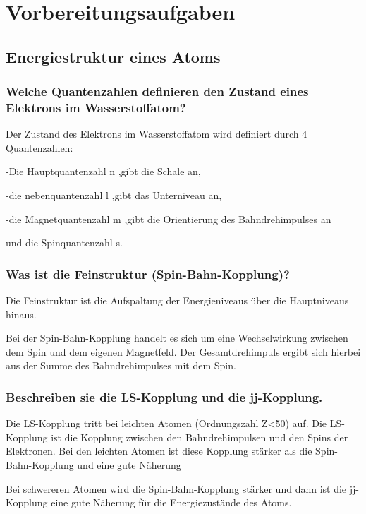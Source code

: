 \section{Vorbereitungsaufgaben}

\subsection{Energiestruktur eines Atoms}

\subsubsection{Welche Quantenzahlen definieren den Zustand eines Elektrons im Wasserstoffatom?}

Der Zustand des Elektrons im Wasserstoffatom wird definiert durch 4 Quantenzahlen:

-Die Hauptquantenzahl n ,gibt die Schale an,

-die nebenquantenzahl l ,gibt das Unterniveau an,

-die Magnetquantenzahl m ,gibt die Orientierung des Bahndrehimpulses an

und die Spinquantenzahl s. 

\subsubsection{Was ist die Feinstruktur (Spin-Bahn-Kopplung)?}

Die Feinstruktur ist die Aufspaltung der Energieniveaus über die Hauptniveaus hinaus.

\noindent Bei der Spin-Bahn-Kopplung handelt es sich um eine Wechselwirkung zwischen dem Spin und dem eigenen Magnetfeld. Der Gesamtdrehimpuls ergibt sich hierbei aus der Summe des Bahndrehimpulses mit dem Spin.

\subsubsection{Beschreiben sie die LS-Kopplung und die jj-Kopplung.}

Die LS-Kopplung tritt bei leichten Atomen (Ordnungszahl Z<50) auf. Die LS-Kopplung ist die Kopplung zwischen den Bahndrehimpulsen und den Spins der Elektronen. Bei den leichten Atomen ist diese Kopplung stärker als die Spin-Bahn-Kopplung und eine gute Näherung

\noindent Bei schwereren Atomen wird die Spin-Bahn-Kopplung stärker und dann ist die jj-Kopplung eine gute Näherung für die Energiezustände des Atoms. 

